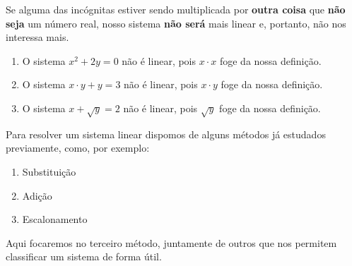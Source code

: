 Se alguma das incógnitas estiver sendo multiplicada por \textbf{outra coisa} que \textbf{não seja} um número real, nosso sistema \textbf{não será} mais linear e, portanto, não nos interessa mais.

\Example

\begin{enumerate}
    \item O sistema $x^2+2y=0$ não é linear, pois $x\cdot x$ foge da nossa definição.
    \item O sistema $x\cdot y+y=3$ não é linear, pois $x\cdot y$ foge da nossa definição.
    \item O sistema $x+\sqrt{y}=2$ não é linear, pois $\sqrt{y}$ foge da nossa definição.
\end{enumerate}

Para resolver um sistema linear dispomos de alguns métodos já estudados previamente, como, por exemplo:

\begin{enumerate}[label=(\Roman*), align=Center]
    \item Substituição
    \item Adição
    \item Escalonamento
\end{enumerate}

Aqui focaremos no terceiro método, juntamente de outros que nos permitem classificar um sistema de forma útil.